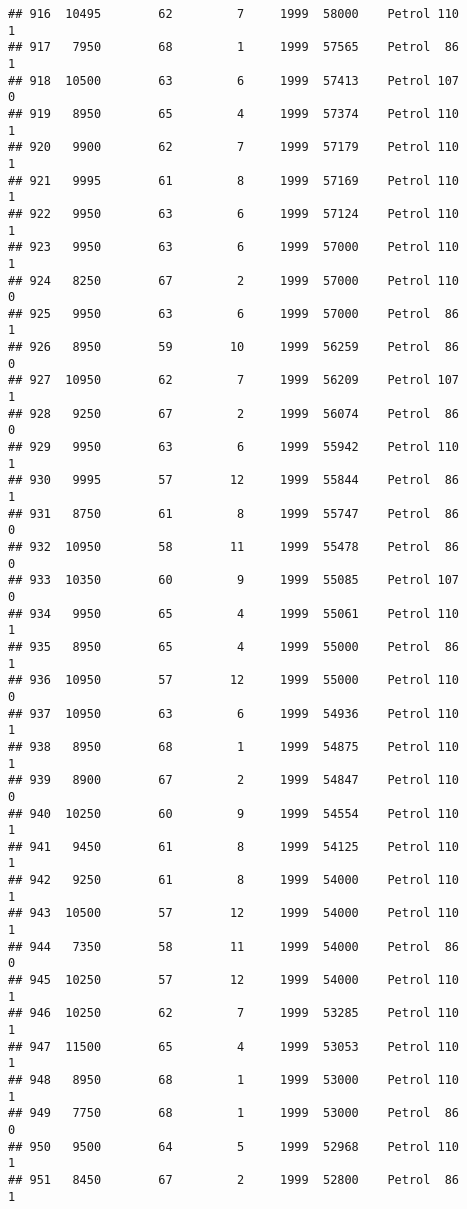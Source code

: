 \documentclass[]{article}
\begin{document}
\begin{verbatim}
## 916  10495        62         7     1999  58000    Petrol 110         1
## 917   7950        68         1     1999  57565    Petrol  86         1
## 918  10500        63         6     1999  57413    Petrol 107         0
## 919   8950        65         4     1999  57374    Petrol 110         1
## 920   9900        62         7     1999  57179    Petrol 110         1
## 921   9995        61         8     1999  57169    Petrol 110         1
## 922   9950        63         6     1999  57124    Petrol 110         1
## 923   9950        63         6     1999  57000    Petrol 110         1
## 924   8250        67         2     1999  57000    Petrol 110         0
## 925   9950        63         6     1999  57000    Petrol  86         1
## 926   8950        59        10     1999  56259    Petrol  86         0
## 927  10950        62         7     1999  56209    Petrol 107         1
## 928   9250        67         2     1999  56074    Petrol  86         0
## 929   9950        63         6     1999  55942    Petrol 110         1
## 930   9995        57        12     1999  55844    Petrol  86         1
## 931   8750        61         8     1999  55747    Petrol  86         0
## 932  10950        58        11     1999  55478    Petrol  86         0
## 933  10350        60         9     1999  55085    Petrol 107         0
## 934   9950        65         4     1999  55061    Petrol 110         1
## 935   8950        65         4     1999  55000    Petrol  86         1
## 936  10950        57        12     1999  55000    Petrol 110         0
## 937  10950        63         6     1999  54936    Petrol 110         1
## 938   8950        68         1     1999  54875    Petrol 110         1
## 939   8900        67         2     1999  54847    Petrol 110         0
## 940  10250        60         9     1999  54554    Petrol 110         1
## 941   9450        61         8     1999  54125    Petrol 110         1
## 942   9250        61         8     1999  54000    Petrol 110         1
## 943  10500        57        12     1999  54000    Petrol 110         1
## 944   7350        58        11     1999  54000    Petrol  86         0
## 945  10250        57        12     1999  54000    Petrol 110         1
## 946  10250        62         7     1999  53285    Petrol 110         1
## 947  11500        65         4     1999  53053    Petrol 110         1
## 948   8950        68         1     1999  53000    Petrol 110         1
## 949   7750        68         1     1999  53000    Petrol  86         0
## 950   9500        64         5     1999  52968    Petrol 110         1
## 951   8450        67         2     1999  52800    Petrol  86         1

\end{verbatim}
\end{document}
